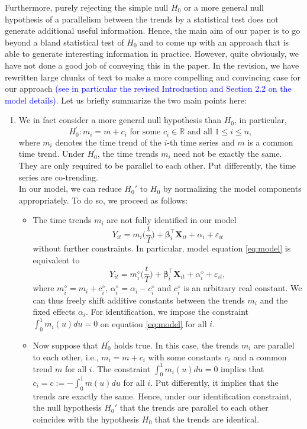 \documentclass[a4paper,12pt]{article}
\begin{document}
\begin{enumerate}[label=\arabic*.,leftmargin=0.6cm]
{Furthermore, purely rejecting the simple null $H_0$ or a more general null hypothesis of a parallelism between the trends by a statistical test does not generate additional useful information.} Hence, the main aim of our paper is to go beyond a bland statistical test of $H_0$ and to come up with an approach that is able to generate interesting information in practice. However, quite obviously, we have not done a good job of conveying this in the paper. In the revision, we have rewritten large chunks of text to make a more compelling and convincing case for our approach \textcolor{blue}{(see in particular the revised Introduction and Section 2.2 on the model details)}. Let us briefly summarize the two main points here: 
\begin{enumerate}[leftmargin=0.7cm]

\item We in fact consider a more general null hypothesis than $H_0$, in particular, 
\[ H_0^\prime: m_i = m + c_i \text{ for some } c_i \in \mathbb{R} \text{ and all } 1 \le i \le n, \]
where $m_i$ denotes the time trend of the $i$-th time series and $m$ is a common time trend. Under $H_0^\prime$, the time trends $m_i$ need not be exactly the same. They are only required to be parallel to each other. Put differently, the time series are co-trending. \\
In our model, we can reduce $H_0'$ to $H_0$ by normalizing the model components appropriately. To do so, we proceed as follows:
\begin{itemize}
\item The time trends $m_i$ are not fully identified in our model
\begin{equation}\label{eq:model}
Y_{it} = m_i\Big(\frac{t}{T}\Big) + \boldsymbol{\beta}_i^\top \boldsymbol{X}_{it} + \alpha_i + \varepsilon_{it} 
\end{equation}
without further constraints. In particular, model equation \eqref{eq:model} is equivalent to 
\[ Y_{it} = m_i^\diamond\Big(\frac{t}{T}\Big) + \boldsymbol{\beta}_i^\top \boldsymbol{X}_{it} + \alpha_i^\diamond + \varepsilon_{it}, \]
where $m_i^\diamond = m_i + c_i^\diamond$, $\alpha_i^\diamond = \alpha_i - c_i^\diamond$ and $c_i^\diamond$ is an arbitrary real constant. We can thus freely shift additive constants between the trends $m_i$ and the fixed effects $\alpha_i$. For identification, we impose the constraint $\int_0^1 m_i(u) du = 0$ on equation \eqref{eq:model} for all $i$.
\item Now suppose that $H_0^\prime$ holds true. In this case, the trends $m_i$ are parallel to each other, i.e., $m_i = m + c_i$ with some constants $c_i$ and a common trend $m$ for all $i$. The constraint $\int_0^1 m_i(u) du = 0$ implies that $c_i = c := -\int_0^1 m(u) du$ for all $i$. Put differently, it implies that the trends are exactly the same. Hence, under our identification constraint, the null hypothesis $H_0'$ that the trends are parallel to each other coincides with the hypothesis $H_0$ that the trends are identical. 

\end{itemize}
\end{enumerate}
\end{enumerate}
\end{document}
